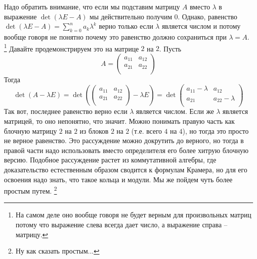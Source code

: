 Надо обратить внимание, что если мы подставим матрицу $A$ вместо $\lambda$ в выражение $\det(\lambda E - A)$ мы действительно получим $0$.
Однако, равенство $\det(\lambda E - A) = \sum_{k = 0}^n  a_k \lambda^k$ верно только если $\lambda$ является числом и потому вообще говоря не понятно почему это равенство должно сохраниться при $\lambda = A$.%
\footnote{На самом деле оно вообще говоря не будет верным для произвольных матриц потому что выражение слева всегда дает число, а выражение справа -- матрицу.}
Давайте продемонстрируем это на матрице $2$ на $2$.
Пусть
\[
A = 
\begin{pmatrix}
{a_{11}}&{a_{12}}\\
{a_{21}}&{a_{22}}\\
\end{pmatrix}
\]
Тогда
\[
\det(A-\lambda E) =
\det
\left(
\begin{pmatrix}
{a_{11}}&{a_{12}}\\
{a_{21}}&{a_{22}}\\
\end{pmatrix}
-\lambda E
\right)=
\det 
\begin{pmatrix}
{a_{11}-\lambda}&{a_{12}}\\
{a_{21}}&{a_{22}-\lambda}\\
\end{pmatrix}
\]
Так вот, последнее равенство верно если $\lambda$ является числом.
Если же $\lambda$ является матрицей, то оно непонятно, что значит.
Можно понимать правую часть как блочную матрицу $2$ на $2$ из блоков $2$ на $2$ (т.е. всего $4$ на $4$), но тогда это просто не верное равенство.
Это рассуждение можно докрутить до верного, но тогда в правой части надо использовать вместо определителя его более хитрую блочную версию.
Подобное рассуждение растет из коммутативной алгебры, где доказательство естественным образом сводится к формулам Крамера, но для его освоения надо знать, что такое кольца и модули.
Мы же пойдем чуть более простым путем.%
\footnote{Ну как сказать простым...}

